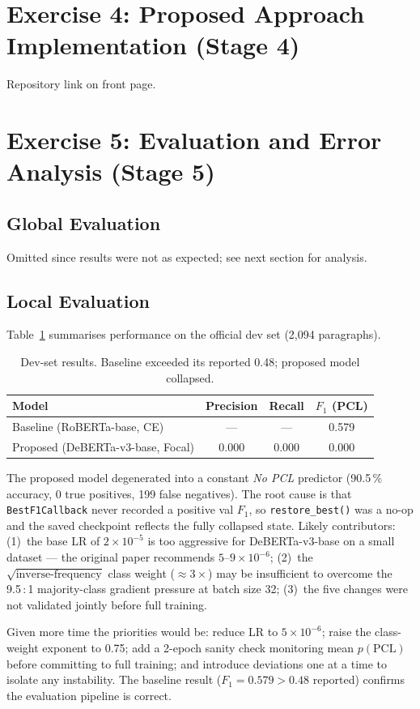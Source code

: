 \documentclass[11pt,a4paper]{article}
\begin{document}
\section{Exercise 4: Proposed Approach Implementation (Stage
4)}\label{sec:implementation}

Repository link on front page.

\section{Exercise 5: Evaluation and Error Analysis (Stage
5)}\label{sec:local_evaluation}

\subsection{Global Evaluation}
Omitted since results were not as expected; see next section for analysis.

\subsection{Local Evaluation}

Table~\ref{tab:results} summarises performance on the official dev set (2,094
paragraphs).

\begin{table}[H]
\centering
\begin{tabular}{lccc}
\toprule
Model & Precision & Recall & $F_1$ (PCL) \\
\midrule
Baseline (RoBERTa-base, CE)        & ---   & ---   & 0.579 \\
Proposed (DeBERTa-v3-base, Focal)  & 0.000 & 0.000 & 0.000 \\
\bottomrule
\end{tabular}
\caption{Dev-set results. Baseline exceeded its reported 0.48; proposed model
collapsed.}\label{tab:results}
\end{table}

The proposed model degenerated into a constant \emph{No PCL} predictor (90.5\,\%
accuracy, 0 true positives, 199 false negatives). The root cause is that
\texttt{BestF1Callback} never recorded a positive val $F_1$, so
\texttt{restore\_best()} was a no-op and the saved checkpoint reflects the fully
collapsed state.  Likely contributors: (1)~the base LR of $2\times10^{-5}$ is
too aggressive for DeBERTa-v3-base on a small dataset --- the original paper
recommends $5\text{--}9\times10^{-6}$; (2)~the $\sqrt{\text{inverse-frequency}}$
class weight ($\approx3\times$) may be insufficient to overcome the 9.5\,:\,1
majority-class gradient pressure at batch size 32; (3)~the five changes were not
validated jointly before full training.

Given more time the priorities would be: reduce LR to $5\times10^{-6}$; raise
the class-weight exponent to 0.75; add a 2-epoch sanity check monitoring mean
$p(\text{PCL})$ before committing to full training; and introduce deviations one
at a time to isolate any instability. The baseline result ($F_1{=}0.579 > 0.48$
reported) confirms the evaluation pipeline is correct.



\end{document}
